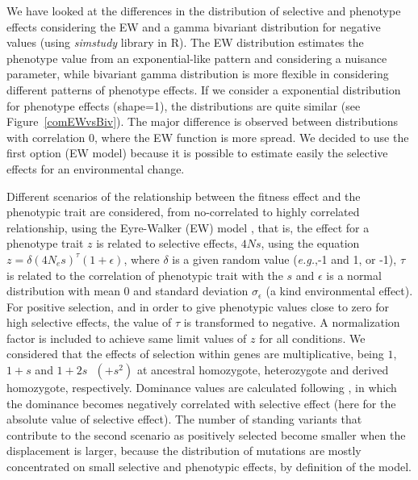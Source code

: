 \documentclass[a4paper,11pt]{article}
\begin{document}
We have looked at the differences in the distribution of selective and phenotype effects considering the EW and a gamma bivariant distribution \citep{Caballero:2015aa} for negative values (using \textit{simstudy} library in R). The EW distribution estimates the phenotype value from an exponential-like pattern and considering a nuisance parameter, while bivariant gamma distribution   is more flexible in considering different patterns of phenotype effects. If we consider a exponential distribution for phenotype effects (shape=1), the distributions are quite similar (see Figure~\ref{comEWvsBiv}). The major difference is observed between distributions with correlation 0, where the EW function is more spread. We decided to use the first option (EW model) because it is possible to estimate easily the selective effects for an environmental change.

Different scenarios of the relationship between the fitness effect and the phenotypic trait are considered, from no-correlated to highly correlated relationship, using the Eyre-Walker (EW) model \citep{Eyre-Walker:2010aa}, that is, the effect for a phenotype trait $z$ is related to selective effects, $4Ns$, using the equation $z=\delta (4N_e s)^\tau (1+\epsilon)$, where $\delta$ is a given random value (\textit{e.g.},-1 and 1, or -1), $\tau$ is related to the correlation of phenotypic trait with the $s$ and $\epsilon$ is a normal distribution with mean 0 and standard deviation $\sigma_{\epsilon}$ (a kind environmental effect). For positive selection, and in order to give phenotypic values close to zero for high selective effects, the value of $\tau$ is transformed to negative. A normalization factor is included to achieve same limit values of $z$ for all conditions. We considered that the effects of selection within genes are multiplicative, being $1$, $1+s$ and $1+2s\text{ }(+s^2)$ at ancestral homozygote, heterozygote and derived homozygote, respectively. Dominance values are calculated following \citep{Wang:1998aa}, in which the dominance becomes negatively correlated with selective effect (here for the absolute value of selective effect).  The number of standing variants that contribute to the second scenario as positively selected become smaller when the displacement is larger, because the distribution of mutations are mostly concentrated on small selective and phenotypic effects, by definition of the model.
\end{document}
